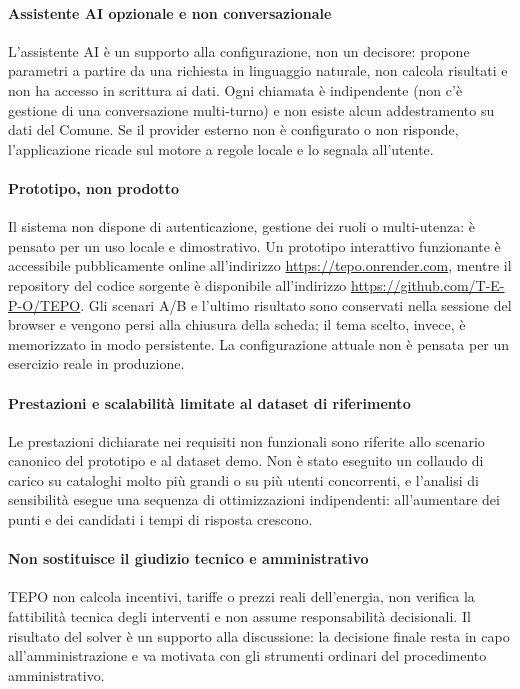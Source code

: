 \paragraph{Assistente AI opzionale e non conversazionale}
L'assistente AI è un supporto alla configurazione, non un decisore: propone parametri a partire da una richiesta in linguaggio naturale, non calcola risultati e non ha accesso in scrittura ai dati. Ogni chiamata è indipendente (non c'è gestione di una conversazione multi-turno) e non esiste alcun addestramento su dati del Comune. Se il provider esterno non è configurato o non risponde, l'applicazione ricade sul motore a regole locale e lo segnala all'utente.

\paragraph{Prototipo, non prodotto}
Il sistema non dispone di autenticazione, gestione dei ruoli o multi-utenza: è pensato per un uso locale e dimostrativo. Un prototipo interattivo funzionante è accessibile pubblicamente online all'indirizzo \url{https://tepo.onrender.com}, mentre il repository del codice sorgente è disponibile all'indirizzo \url{https://github.com/T-E-P-O/TEPO}. Gli scenari A/B e l'ultimo risultato sono conservati nella sessione del browser e vengono persi alla chiusura della scheda; il tema scelto, invece, è memorizzato in modo persistente. La configurazione attuale non è pensata per un esercizio reale in produzione.

\paragraph{Prestazioni e scalabilità limitate al dataset di riferimento}
Le prestazioni dichiarate nei requisiti non funzionali sono riferite allo scenario canonico del prototipo e al dataset demo. Non è stato eseguito un collaudo di carico su cataloghi molto più grandi o su più utenti concorrenti, e l'analisi di sensibilità esegue una sequenza di ottimizzazioni indipendenti: all'aumentare dei punti e dei candidati i tempi di risposta crescono.

\paragraph{Non sostituisce il giudizio tecnico e amministrativo}
TEPO non calcola incentivi, tariffe o prezzi reali dell'energia, non verifica la fattibilità tecnica degli interventi e non assume responsabilità decisionali. Il risultato del solver è un supporto alla discussione: la decisione finale resta in capo all'amministrazione e va motivata con gli strumenti ordinari del procedimento amministrativo.

